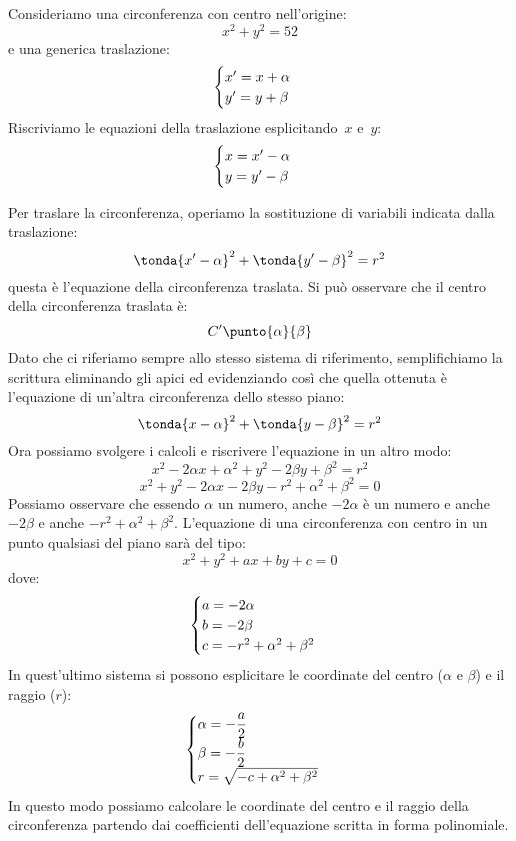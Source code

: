 Consideriamo una circonferenza con centro nell'origine:
\[x^2 + y^2 = 52\]
e una generica traslazione:
\[\begin{cases}x' = x + \alpha \\ y' = y + \beta\end{cases}\]
Riscriviamo le equazioni della traslazione esplicitando~\(x\) e~\(y\):
\[\begin{cases}x = x'- \alpha \\ y = y' - \beta\end{cases}\]

Per traslare la circonferenza, operiamo la sostituzione di variabili
indicata dalla traslazione:
\[\tonda{x'-\alpha}^2 + \tonda{y'-\beta}^2 = r^2\]
questa è l'equazione della circonferenza traslata. Si può osservare che il 
centro della circonferenza traslata è: 
\[C'\punto{\alpha}{\beta}\]
Dato che ci riferiamo sempre allo stesso sistema di riferimento, semplifichiamo 
la scrittura eliminando gli apici ed evidenziando così che quella ottenuta è 
l'equazione di un'altra circonferenza dello stesso piano:
\[\tonda{x-\alpha}^2 + \tonda{y-\beta}^2 = r^2\]
Ora possiamo svolgere i calcoli e riscrivere l'equazione in un altro modo:
\[x^2 -2 \alpha x + \alpha^2 + y^2 -2 \beta y + \beta^2 = r^2\]
\[x^2 + y^2 -2 \alpha x -2 \beta y - r^2 + \alpha^2 + \beta^2 = 0\]
Possiamo osservare che essendo \(\alpha\) un numero, anche \(-2\alpha\) è un 
numero e anche \(-2\beta\) e anche \(- r^2 + \alpha^2 + \beta^2\). 
L'equazione di una circonferenza con centro in un punto qualsiasi del piano 
sarà del tipo:
\[x^2 + y^2 +a x +b y +c = 0\]
dove:
\[\begin{cases}a = -2\alpha \\ b = -2\beta \\ c = -r^2 +\alpha^2 +\beta^2\end{cases}\]
In quest'ultimo sistema si possono esplicitare le coordinate del 
centro (\(\alpha\) e \(\beta\)) e il raggio (\(r\)):
\[\begin{cases}\alpha = -\dfrac{a}{2} \\ 
           \beta = -\dfrac{b}{2} \\ 
           r = \sqrt{-c +\alpha^2 + \beta^2}\end{cases}\]
In questo modo possiamo calcolare le coordinate del centro e il raggio della 
circonferenza partendo dai coefficienti dell'equazione scritta in forma 
polinomiale.


